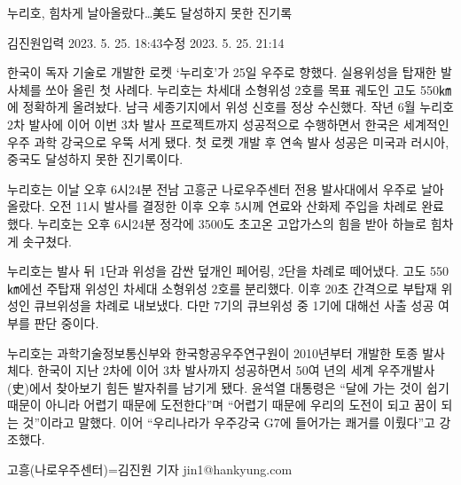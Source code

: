 \documentclass[
  letterpaper,
]{book}
\newenvironment{Shaded}{\begin{snugshade}}{\end{snugshade}}
\newcommand{\NormalTok}[1]{\textcolor[rgb]{0.00,0.23,0.31}{#1}}
\begin{document}
\begin{tcolorbox}[enhanced jigsaw, opacityback=0, opacitybacktitle=0.6, colback=white, rightrule=.15mm, coltitle=black, colframe=quarto-callout-note-color-frame, colbacktitle=quarto-callout-note-color!10!white, bottomrule=.15mm, bottomtitle=1mm, breakable, title=\textcolor{quarto-callout-note-color}{\faInfo}\hspace{0.5em}{프롬프트: 아래 뉴스기사는 백틱기호(`) 세개 사이에 담겨져 있습니다. 다음
뉴스기사를 이미지로 나타내기 위해 midjourney text prompt를 작성해세요.}, titlerule=0mm, leftrule=.75mm, toptitle=1mm, left=2mm, arc=.35mm, toprule=.15mm]

\begin{Shaded}
\begin{Highlighting}[]
\NormalTok{누리호, 힘차게 날아올랐다…美도 달성하지 못한 진기록}

\NormalTok{김진원입력 2023. 5. 25. 18:43수정 2023. 5. 25. 21:14}

\NormalTok{한국이 독자 기술로 개발한 로켓 ‘누리호’가 25일 우주로 향했다. 실용위성을 탑재한 발사체를 쏘아 올린 첫 사례다. 누리호는 차세대 소형위성 2호를 목표 궤도인 고도 550㎞에 정확하게 올려놨다. 남극 세종기지에서 위성 신호를 정상 수신했다. 작년 6월 누리호 2차 발사에 이어 이번 3차 발사 프로젝트까지 성공적으로 수행하면서 한국은 세계적인 우주 과학 강국으로 우뚝 서게 됐다. 첫 로켓 개발 후 연속 발사 성공은 미국과 러시아, 중국도 달성하지 못한 진기록이다. }

\NormalTok{누리호는 이날 오후 6시24분 전남 고흥군 나로우주센터 전용 발사대에서 우주로 날아올랐다. 오전 11시 발사를 결정한 이후 오후 5시께 연료와 산화제 주입을 차례로 완료했다. 누리호는 오후 6시24분 정각에 3500도 초고온 고압가스의 힘을 받아 하늘로 힘차게 솟구쳤다.}


\NormalTok{누리호는 발사 뒤 1단과 위성을 감싼 덮개인 페어링, 2단을 차례로 떼어냈다. 고도 550㎞에선 주탑재 위성인 차세대 소형위성 2호를 분리했다. 이후 20초 간격으로 부탑재 위성인 큐브위성을 차례로 내보냈다. 다만 7기의 큐브위성 중 1기에 대해선 사출 성공 여부를 판단 중이다.}

\NormalTok{누리호는 과학기술정보통신부와 한국항공우주연구원이 2010년부터 개발한 토종 발사체다. 한국이 지난 2차에 이어 3차 발사까지 성공하면서 50여 년의 세계 우주개발사(史)에서 찾아보기 힘든 발자취를 남기게 됐다. 윤석열 대통령은 “달에 가는 것이 쉽기 때문이 아니라 어렵기 때문에 도전한다”며 “어렵기 때문에 우리의 도전이 되고 꿈이 되는 것”이라고 말했다. 이어 “우리나라가 우주강국 G7에 들어가는 쾌거를 이뤘다”고 강조했다.}

\NormalTok{고흥(나로우주센터)=김진원 기자 jin1@hankyung.com}
\end{Highlighting}
\end{Shaded}


\end{tcolorbox}
\end{document}
